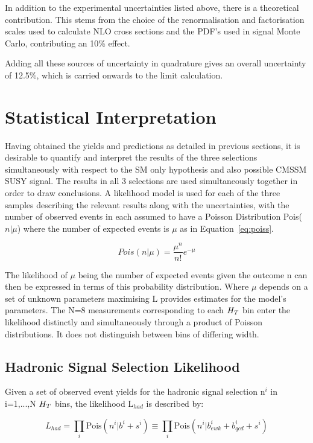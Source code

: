 In addition to the experimental uncertainties listed above, there is a theoretical contribution. This stems from the choice of the renormalisation and factorisation scales used to calculate NLO cross sections and the PDF's used in signal Monte Carlo,  contributing an 10\% effect. 

Adding all these sources of uncertainty in quadrature gives an overall uncertainty of 12.5\%, which is carried onwards to the limit calculation. 

\section{Statistical Interpretation}
\label{sec:fit}
Having obtained the yields and predictions as detailed in previous sections, it is desirable to quantify and interpret the results of the three selections simultaneously with respect to the SM only hypothesis and also possible CMSSM SUSY signal. The results in all 3 selections are used simultaneously together in order to draw conclusions. A likelihood model is used for each of the three samples describing the relevant results along with the uncertainties, with the number of observed events in each assumed to have a Poisson Distribution Pois($n | \mu$) where the number of expected events is $\mu$ as in Equation~\ref{eq:poiss}.

\begin{equation}
Pois(n | \mu)  = \frac{\mu^{n}}{n!} e^{-\mu}
\label{eq:poiss} 
\end{equation}

The likelihood of $\mu$ being the number of expected events given the outcome n can then be expressed in terms of this probability distribution. Where $\mu$ depends on a set of unknown parameters maximising L provides estimates for the model's parameters. The N=8 measurements corresponding to each $H_{T}$ bin enter the likelihood distinctly and simultaneously through a product of Poisson distributions. It does not distinguish between bins of differing width. 

\subsection{Hadronic Signal Selection Likelihood}

Given a set of observed event yields for the hadronic signal selection n$^{i}$ in i=1,...,N $ H_{T}$ bins, the likelihood L$_{had}$ is described by:

\begin{equation}
L_{had} = \prod_{i} \textrm{Pois}(n^{i}|b^{i} + s^{i}) \equiv \prod_{i} \textrm{Pois}(n^{i} | b^{i}_{ewk} + b^{i}_{qcd} + s^{i})
\label{eq:Lhad1}
\end{equation}

